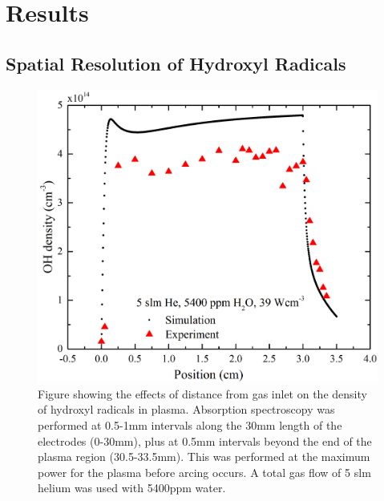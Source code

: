 \documentclass[11pt, oneside]{article}   	%
\begin{document}
\section{Results}

\subsection{Spatial Resolution of Hydroxyl Radicals}

\begin{figure}
    \centering
    \includegraphics[width=\textwidth]{Figures/OHSpatialwithSim.jpg}
    \caption{Figure showing the effects of distance from gas inlet on the density of hydroxyl radicals in plasma. Absorption spectroscopy was performed at 0.5-1mm intervals along the 30mm length of the electrodes (0-30mm), plus at 0.5mm intervals beyond the end of the plasma region (30.5-33.5mm). This was performed at the maximum power for the plasma before arcing occurs. A total gas flow of 5 slm helium was used with 5400ppm water.}
    \label{fig:SpatialRes}
\end{figure}
\end{document}
